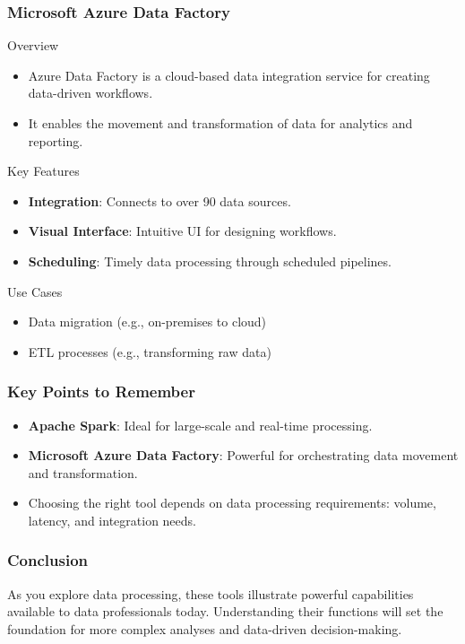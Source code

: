 \documentclass[aspectratio=169]{beamer}
\begin{document}
\begin{frame}
  \frametitle{Microsoft Azure Data Factory}
  \begin{block}{Overview}
  \begin{itemize}
    \item Azure Data Factory is a cloud-based data integration service for creating data-driven workflows.
    \item It enables the movement and transformation of data for analytics and reporting.
  \end{itemize}
  \end{block}

  \begin{block}{Key Features}
  \begin{itemize}
    \item \textbf{Integration}: Connects to over 90 data sources.
    \item \textbf{Visual Interface}: Intuitive UI for designing workflows.
    \item \textbf{Scheduling}: Timely data processing through scheduled pipelines.
  \end{itemize}
  \end{block}
  
  \begin{block}{Use Cases}
  \begin{itemize}
    \item Data migration (e.g., on-premises to cloud)
    \item ETL processes (e.g., transforming raw data)
  \end{itemize}
  \end{block}
\end{frame}

\begin{frame}
  \frametitle{Key Points to Remember}
  \begin{itemize}
    \item \textbf{Apache Spark}: Ideal for large-scale and real-time processing.
    \item \textbf{Microsoft Azure Data Factory}: Powerful for orchestrating data movement and transformation.
    \item Choosing the right tool depends on data processing requirements: volume, latency, and integration needs.
  \end{itemize}
\end{frame}

\begin{frame}
  \frametitle{Conclusion}
  As you explore data processing, these tools illustrate powerful capabilities available to data professionals today. Understanding their functions will set the foundation for more complex analyses and data-driven decision-making.
\end{frame}
\end{document}
